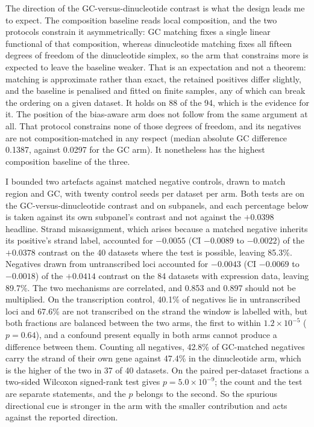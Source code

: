 The direction of the GC-versus-dinucleotide contrast is what the design leads me to expect. The
composition baseline reads local composition, and the two protocols constrain it
asymmetrically: GC matching fixes a single linear functional of that composition, whereas
dinucleotide matching fixes all fifteen degrees of freedom of the dinucleotide simplex, so the
arm that constrains more is expected to leave the baseline weaker. That is an expectation and
not a theorem: matching is approximate rather than exact, the retained positives differ
slightly, and the baseline is penalised and fitted on finite samples, any of which can break
the ordering on a given dataset. It holds on 88 of the 94, which is the evidence for it. The
position of the bias-aware arm does not follow from the same argument at all.
That protocol
constrains none of those degrees of freedom, and its negatives are not
composition-matched in any respect (median absolute GC difference 0.1387, against 0.0297 for
the GC arm). It nonetheless has the highest composition baseline of the three.

I bounded two artefacts against matched negative controls, drawn to match region and GC, with
twenty control seeds per dataset per arm. Both tests are on the GC-versus-dinucleotide contrast and on subpanels, and
each percentage below is taken against its own subpanel's contrast and not against the
$+0.0398$ headline. Strand misassignment, which arises because a matched negative inherits its
positive's
strand label, accounted for $-0.0055$ (CI $-0.0089$ to $-0.0022$) of the $+0.0378$ contrast on
the 40 datasets where the test is possible, leaving 85.3\%. Negatives drawn from untranscribed
loci accounted for $-0.0043$ (CI $-0.0069$ to $-0.0018$) of the $+0.0414$ contrast on the 84
datasets with expression data, leaving 89.7\%. The two mechanisms are correlated, and 0.853 and
0.897 should not be multiplied. On the transcription control, 40.1\% of negatives lie in
untranscribed loci and 67.6\% are not transcribed on the strand the window is labelled with, but
both fractions are balanced between the two arms, the first to within $1.2\times10^{-5}$
($p=0.64$), and a confound present equally in both arms cannot produce a difference between
them. Counting all negatives, 42.8\% of GC-matched negatives carry the strand of their own gene
against 47.4\% in the dinucleotide arm, which is the higher of the two in 37 of 40 datasets. On
the paired per-dataset fractions a two-sided Wilcoxon signed-rank test gives
$p=5.0\times10^{-9}$; the count and the test are separate statements, and the $p$ belongs to the
second. So the spurious directional cue is stronger
in the arm with the smaller contribution and acts against the reported direction.

